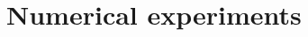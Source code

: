 \documentclass[11pt,twoside]{article}
\theoremstyle{nonumberplain}
\begin{document}
{%

\section{Numerical experiments}




}
\end{document}
